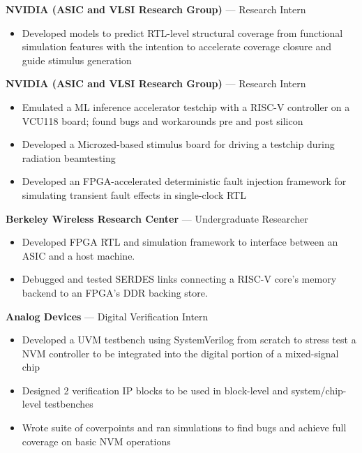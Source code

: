 \documentclass[10pt]{article}
\begin{document}
 \textbf{NVIDIA (ASIC and VLSI Research Group)} --- Research Intern
\begin{itemize}
    \item Developed models to predict RTL-level structural coverage from functional simulation features with the intention to accelerate coverage closure and guide stimulus generation
\end{itemize}
\vspace{0.2cm}

 \textbf{NVIDIA (ASIC and VLSI Research Group)} --- Research Intern
\begin{itemize}
    \item Emulated a ML inference accelerator testchip with a RISC-V controller on a VCU118 board; found bugs and workarounds pre and post silicon
    \item Developed a Microzed-based stimulus board for driving a testchip during radiation beamtesting
    \item Developed an FPGA-accelerated deterministic fault injection framework for simulating transient fault effects in single-clock RTL
\end{itemize}
\vspace{0.2cm}

 \textbf{Berkeley Wireless Research Center} --- Undergraduate Researcher
\begin{itemize}
    \item Developed FPGA RTL and simulation framework to interface between an ASIC and a host machine.
    \item Debugged and tested SERDES links connecting a RISC-V core's memory backend to an FPGA's DDR backing store.
\end{itemize}

 \textbf{Analog Devices} --- Digital Verification Intern
\begin{itemize}
    \item Developed a UVM testbench using SystemVerilog from scratch to stress test a NVM controller to be integrated into the digital portion of a mixed-signal chip
    \item Designed 2 verification IP blocks to be used in block-level and system/chip-level testbenches
    \item Wrote suite of coverpoints and ran simulations to find bugs and achieve full coverage on basic NVM operations
\end{itemize}
\end{document}
